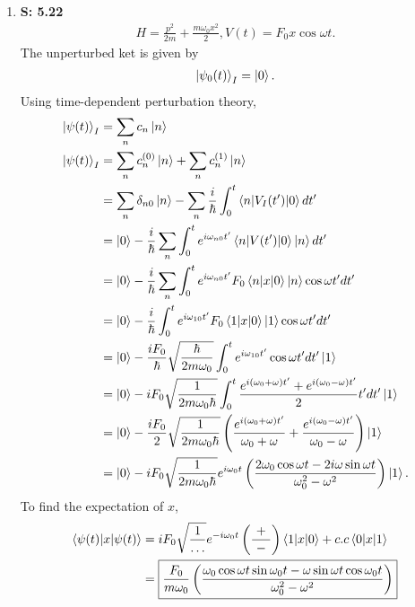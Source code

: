\documentclass[12pt, letterpaper]{article}
\begin{document}
\begin{enumerate}
\item[] \textbf{S: 5.22}
\begin{align}
    H = \frac{p^2}{2m}+\frac{m\omega_0 x^2}{2}, V(t) = F_0x\cos\omega t.
\end{align}
The unperturbed ket is given by
\begin{align}
    \ket{\psi_0(t)}_I = \ket{0}.
\end{align}
Using time-dependent perturbation theory,
\begin{align}
\ket{\psi(t)}_I &= \sum_n c_n\ket{n}\\
\ket{\psi(t)}_I &= \sum_n c_n^{(0)}\ket{n} + \sum_nc_n^{(1)}\ket{n}\\
&=\sum_n\delta_{n0}\ket{n} - \sum_n \frac{i}{\hbar} \int_0^t
    \braket{n|V_I(t')|0}dt'\\
&=\ket{0}-\frac{i}{\hbar}\sum_n \int_0^t e^{i\omega_{n0}t'}
    \braket{n|V(t')|0}\ket{n}dt'\\
&=\ket{0}-\frac{i}{\hbar}\sum_n \int_0^t e^{i\omega_{n0}t'}F_0
    \braket{n|x|0}\ket{n}\cos\omega t'dt'\\
&=\ket{0}-\frac{i}{\hbar} \int_0^t e^{i\omega_{10}t'}F_0
    \braket{1|x|0}\ket{1}\cos\omega t'dt'\\
&=\ket{0}-\frac{iF_0}{\hbar}\sqrt{\frac{\hbar}{2m\omega_0}}\int_0^t
    e^{i\omega_{10}t'}\cos\omega t'dt'\ket{1}\\
&=\ket{0}-iF_0\sqrt{\frac{1}{2m\omega_0\hbar}}\int_0^t\frac{
    e^{i(\omega_0+\omega)t'}+e^{i(\omega_0-\omega)t'}}{2} t'dt'\ket{1}\\
&=\ket{0}-\frac{iF_0}{2}\sqrt{\frac{1}{2m\omega_0\hbar}}\left(\frac{
    e^{i(\omega_0+\omega)t'}}{\omega_0+\omega}+\frac{
    e^{i(\omega_0-\omega)t'}}{\omega_0-\omega}\right)\ket{1}\\
&=\ket{0}-iF_0\sqrt{\frac{1}{2m\omega_0\hbar}}e^{i\omega_0t}\left(\frac{
    2\omega_0\cos\omega t-2i\omega\sin{\omega t}}
    {\omega_0^2-\omega^2}\right)\ket{1}.
\end{align}
To find the expectation of $x$,
\begin{align}
\braket{\psi(t)|x|\psi(t)} &= iF_0\sqrt{\frac{1}{\dots}} e^{-i\omega_0t}
    \left(\frac{\ +\ }{-}\right)\braket{1|x|0} + c.c\braket{0|x|1}\\
&= \boxed{\frac{F_0}{m\omega_0}\left(\frac{\omega_0\cos\omega t\sin\omega_0 t
    -\omega\sin\omega t\cos\omega_0 t}{\omega_0^2-\omega^2}\right)}
\end{align}
    
    

\end{enumerate}
\end{document}
